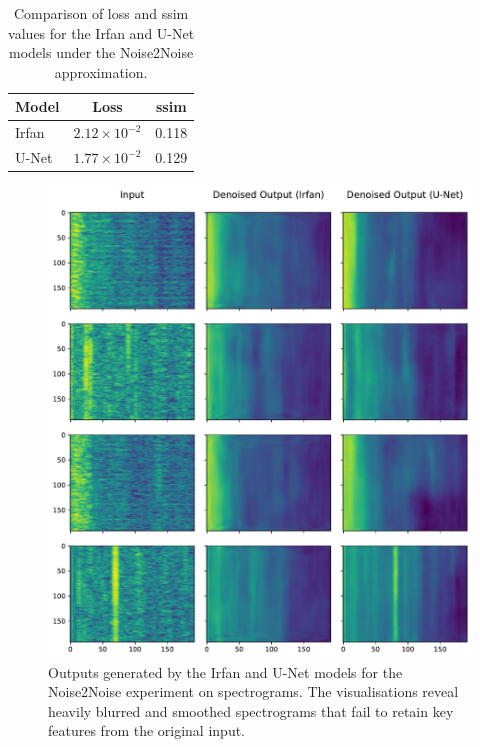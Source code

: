 \begin{table}[htbp] 
\centering 
\caption{Comparison of loss and \acrshort{ssim} values for the Irfan and U-Net models under the Noise2Noise approximation.} 
\label{tab:n2n-diff-spec-results} 
    \begin{tabular}{lcc} 
    \toprule 
    \textbf{Model} & \textbf{Loss} & \textbf{\acrshort{ssim}}\\ \midrule 
    Irfan & $2.12 \times 10^{-2}$ & 0.118 \\
    U-Net & $1.77 \times 10^{-2}$ & 0.129 \\
    \bottomrule
    \end{tabular} 
\end{table}

\begin{figure}[p]
    \centering
    \includegraphics[width=\textwidth]{img/ch6/in_neq_out/results.pdf}
    \caption{Outputs generated by the Irfan and U-Net models for the Noise2Noise experiment on spectrograms. The visualisations reveal heavily blurred and smoothed spectrograms that fail to retain key features from the original input.}
    \label{fig:n2n-diff-spec-results}
\end{figure}

